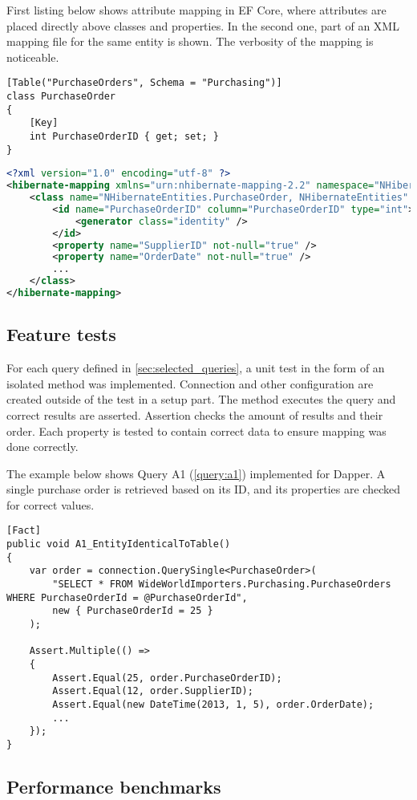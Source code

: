 First listing below shows attribute mapping in EF Core, where attributes are placed directly above classes and properties. In the second one, part of an XML mapping file for the same entity is shown. The verbosity of the mapping is noticeable.

\begin{lstlisting}[language=CSharp,basicstyle=\ttfamily\footnotesize]
[Table("PurchaseOrders", Schema = "Purchasing")]
class PurchaseOrder
{
    [Key]
    int PurchaseOrderID { get; set; }
}
\end{lstlisting}

\begin{lstlisting}[language=xml,basicstyle=\ttfamily\footnotesize]
<?xml version="1.0" encoding="utf-8" ?>
<hibernate-mapping xmlns="urn:nhibernate-mapping-2.2" namespace="NHibernateEntities">
    <class name="NHibernateEntities.PurchaseOrder, NHibernateEntities" table="PurchaseOrders" schema="Purchasing">
        <id name="PurchaseOrderID" column="PurchaseOrderID" type="int">
            <generator class="identity" />
        </id>
        <property name="SupplierID" not-null="true" />
        <property name="OrderDate" not-null="true" />
        ...
    </class>
</hibernate-mapping>
\end{lstlisting}

\subsection{Feature tests}

For each query defined in \autoref{sec:selected_queries}, a unit test in the form of an isolated method was implemented. Connection and other configuration are created outside of the test in a setup part. The method executes the query and correct results are asserted. Assertion checks the amount of results and their order. Each property is tested to contain correct data to ensure mapping was done correctly.

The example below shows Query A1 (\autoref{query:a1}) implemented for Dapper. A single purchase order is retrieved based on its ID, and its properties are checked for correct values. 
\begin{lstlisting}[language=CSharp]
[Fact]
public void A1_EntityIdenticalToTable()
{
    var order = connection.QuerySingle<PurchaseOrder>(
        "SELECT * FROM WideWorldImporters.Purchasing.PurchaseOrders WHERE PurchaseOrderId = @PurchaseOrderId",
        new { PurchaseOrderId = 25 }
    );

    Assert.Multiple(() =>
    {
        Assert.Equal(25, order.PurchaseOrderID);
        Assert.Equal(12, order.SupplierID);
        Assert.Equal(new DateTime(2013, 1, 5), order.OrderDate);
        ...
    });
}
\end{lstlisting}

\subsection{Performance benchmarks}